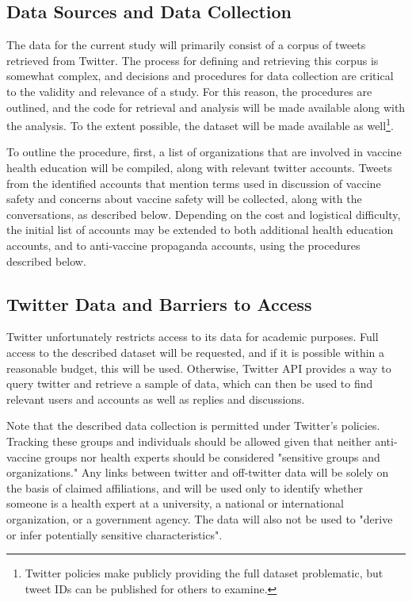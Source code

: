 \documentclass{article}
\begin{document}
\subsection{Data Sources and Data Collection}
The data for the current study will primarily consist of a corpus of tweets retrieved from Twitter. The process for defining and retrieving this corpus is somewhat complex, and decisions and procedures for data collection are critical to the validity and relevance of a study. For this reason, the procedures are outlined, and the code for retrieval and analysis will be made available along with the analysis. To the extent possible, the dataset will be made available as well\footnote{Twitter policies make publicly providing the full dataset problematic, but tweet IDs can be published for others to examine.}.

To outline the procedure, first, a list of organizations that are involved in vaccine health education will be compiled, along with relevant twitter accounts.  Tweets from the identified accounts that mention terms used in discussion of vaccine safety and concerns about vaccine safety will be collected, along with the conversations, as described below. Depending on the cost and logistical difficulty, the initial list of accounts may be extended to both additional health education accounts, and to anti-vaccine propaganda accounts, using the procedures described below.

\subsection{Twitter Data and Barriers to Access}
Twitter unfortunately restricts access to its data for academic purposes. \cite{Alaimo2018} Full access to the described dataset will be requested, and if it is possible within a reasonable budget, this will be used. Otherwise, Twitter API provides a way to query twitter and retrieve a sample of data, which can then be used to find relevant users and accounts as well as replies and discussions. 

Note that the described data collection is permitted under Twitter's policies. Tracking these groups and individuals should be allowed given that neither anti-vaccine groups nor health experts should be considered "sensitive groups and organizations." Any links between twitter and off-twitter data will be solely on the basis of claimed affiliations, and will be used only to identify whether someone is a health expert at a university, a national or international organization, or a government agency. The data will also not be used to "derive or infer potentially sensitive characteristics".
\end{document}
